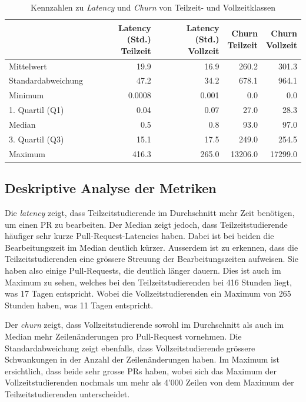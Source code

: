 \begin{table}[htbp]
    \centering
    \caption{Kennzahlen zu \textit{Latency} und \textit{Churn} von Teilzeit- und Vollzeitklassen}
    \begin{tabular}{@{}lrrrr@{}}
        \toprule
        \makecell{}&
        \makecell{\textbf{Latency (Std.)} \\ \textbf{Teilzeit}}&
        \makecell{\textbf{Latency (Std.)} \\ \textbf{Vollzeit}}&
        \makecell{\textbf{Churn} \\ \textbf{Teilzeit}}&
        \makecell{\textbf{Churn} \\ \textbf{Vollzeit}}\\
        \midrule
        Mittelwert & 19.9 & 16.9 & 260.2 & 301.3 \\
        Standardabweichung &  47.2 & 34.2  & 678.1 & 964.1 \\
        Minimum & 0.0008 & 0.001 & 0.0 & 0.0 \\
        1. Quartil (Q1) & 0.04 & 0.07 & 27.0 & 28.3\\
        Median & 0.5 & 0.8 & 93.0 & 97.0 \\
        3. Quartil (Q3) &  15.1 & 17.5 & 249.0 & 254.5 \\
        Maximum & 416.3 & 265.0 & 13206.0 & 17299.0 \\
        \bottomrule
    \end{tabular}
    \label{tab:deskriptive-kennzahlen-teilzeit-vollzeit}
\end{table}

\newpage
\subsection{Deskriptive Analyse der Metriken}
Die \textit{latency} zeigt, dass Teilzeitstudierende im Durchschnitt mehr Zeit benötigen, um einen PR zu bearbeiten. Der Median zeigt jedoch, dass Teilzeitstudierende häufiger sehr kurze Pull-Request-Latencies haben. Dabei ist bei beiden die Bearbeitungszeit im Median deutlich kürzer. Ausserdem ist zu erkennen, dass die Teilzeitstudierenden eine grössere Streuung der Bearbeitungszeiten aufweisen. Sie haben also einige Pull-Requests, die deutlich länger dauern. Dies ist auch im Maximum zu sehen, welches bei den Teilzeitstudierenden bei 416 Stunden liegt, was 17 Tagen entspricht. Wobei die Vollzeitstudierenden ein Maximum von 265 Stunden haben, was 11 Tagen entspricht.

Der \textit{churn} zeigt, dass Vollzeitstudierende sowohl im Durchschnitt als auch im Median mehr Zeilenänderungen pro Pull-Request vornehmen. Die Standardabweichung zeigt ebenfalls, dass Vollzeitstudierende grössere Schwankungen in der Anzahl der Zeilenänderungen haben. Im Maximum ist ersichtlich, dass beide sehr grosse PRs haben, wobei sich das Maximum der Vollzeitstudierenden nochmals um mehr als 4'000 Zeilen von dem Maximum der Teilzeitstudierenden unterscheidet.

